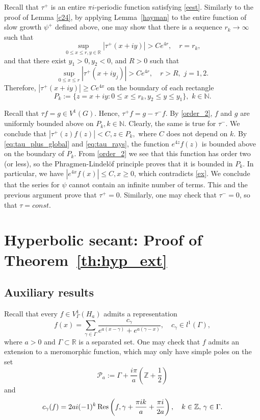 \documentclass[12pt]{amsart}
\numberwithin{equation}{section}
\theoremstyle{plain}
\theoremstyle{definition}
\newcommand{\R}{{\mathbb R}} \newcommand{\Q}{{\mathbb Q}} \newcommand{\Z}{{\mathbb Z}} \newcommand{\N}{{\mathbb N}}
\def\res{\mathop{{\rm Res}}\limits}
\begin{document}
Recall that $\tau^+$ is an entire $\pi i$-periodic function satisfying \eqref{eest}.
Similarly to the proof  of Lemma \ref{c24}, by applying Lemma~\ref{hayman} to the entire function of slow growth $\psi^+$ defined above, one may show that there is a sequence $r_k\to\infty$ such that 
\begin{equation}\label{eq:tau_plus_global}
  \sup_{0\leq x\leq r,y\in\R}|\tau^{+}(x+iy)| > Ce^{4r}, \quad r=r_k,  
\end{equation}
and that there exist $y_1 > 0, y_2 < 0 $, and $R > 0$ such that 
\begin{equation}\label{eq:tau_rays}
  \sup_{0\leq x\leq r}|\tau^{+}(x+iy_j)| > Ce^{4r}, \quad r>R, \,\, j=1,2.  
\end{equation}Therefore, $|\tau^+(x+iy)|\geq Ce^{4x}$ on the boundary of each rectangle $$P_k:=\{z=x+iy: 0\leq x\leq r_k, y_2\leq y\leq y_1\}, \,\, k\in\N.$$

Recall that $\tau f=g\in V^1(G)$. Hence, $\tau^+ f=g-\tau^-f$. By \eqref{order_2}, $f$ and $g$  are uniformly bounded above on $P_k, k\in\N.$ Clearly, the same is true for $\tau^-$. We conclude that $|\tau^+(z)f(z)|<C, z\in P_k,$ where $C$ does not depend on $k$.
By \eqref{eq:tau_plus_global} and \eqref{eq:tau_rays}, the function $e^{4z}f(z)$ is bounded above on the boundary of $P_k$. From \eqref{order_2} we see that this function has order two (or less), so the  Phragmen-Lindel\"of principle proves that it is bounded in $P_k$. In particular, we have $|e^{4x}f(x)|\le C, x \ge 0$, which contradicts \eqref{ex}. We conclude that the series for $\psi$ cannot contain an infinite number of terms. This and the previous argument prove that $\tau^+=0.$ Similarly, one may check that $\tau^-=0$, so that $\tau=const.$ 
    


\section{Hyperbolic secant: Proof of Theorem~\ref{th:hyp_ext}}

\subsection{Auxiliary results}

Recall that every $f\in V^1_\Gamma(H_a)$ admits a representation 
\begin{equation}\label{eq:f_sec}
  f(x)=\sum_{\gamma\in\Gamma}\frac{c_\gamma}{e^{a(x-\gamma)}+e^{a(\gamma-x)}},\quad c_\gamma\in l^1(\Gamma),  
\end{equation}
where $a>0$ and $\Gamma \subset \R$ is a separated set. One may check that $f$ admits an extension to a meromorphic function, which may only have simple poles on the set 
 \begin{equation}\label{pa}  \mathcal{P}_a:= \Gamma+\frac{i\pi}{a}\left(\Z+\frac{1}{2}\right) \end{equation} and   
 \begin{equation}\label{res}c_\gamma(f)=2ai(-1)^k\res\left(f,\gamma+ \frac{\pi i k}{a}+\frac{\pi i}{2a}\right),\quad  k\in\Z,\, \gamma \in \Gamma. \end{equation}   
\end{document}
